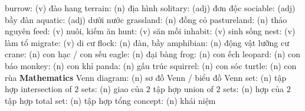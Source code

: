 \begin{multicols}{2}
{		\vskip 0.1cm
		{\color{toancuabi}burrow:} (v)  đào hang
		\vskip 0.1cm
		{\color{toancuabi}terrain:} (n)  địa hình
		\vskip 0.1cm
		{\color{toancuabi}solitary:} (adj)  đơn độc
		\vskip 0.1cm
		{\color{toancuabi}sociable:} (adj)  bầy đàn
		\vskip 0.1cm
		{\color{toancuabi}aquatic:} (adj)  dưới nước
		\vskip 0.1cm
		{\color{toancuabi}grassland:} (n)  đồng cỏ
		\vskip 0.1cm
		{\color{toancuabi}pastureland:} (n)  thảo nguyên
		\vskip 0.1cm
		{\color{toancuabi}feed:} (v)  nuôi, kiếm ăn
		\vskip 0.1cm
		{\color{toancuabi}hunt:} (v)  săn mồi 
		\vskip 0.1cm
		{\color{toancuabi}inhabit:} (v)  sinh sống 
		\vskip 0.1cm
		{\color{toancuabi}nest:} (v)  làm tổ 
		\vskip 0.1cm
		{\color{toancuabi}migrate:} (v)  di cư
		\vskip 0.1cm
		{\color{toancuabi}flock:} (n)  đàn, bầy
		\vskip 0.1cm
		{\color{toancuabi}amphibian:} (n)  động vật lưỡng cư
		\vskip 0.1cm
		{\color{toancuabi}crane:} (n)  con hạc / con sếu
		\vskip 0.1cm
		{\color{toancuabi}eagle:} (n)  đại bàng
		\vskip 0.1cm
		{\color{toancuabi}frog:} (n)  con ếch
		\vskip 0.1cm
		{\color{toancuabi}leopard:} (n)  con báo
		\vskip 0.1cm
		{\color{toancuabi}monkey:} (n)  con khỉ
		\vskip 0.1cm
		{\color{toancuabi}panda:} (n)  gấu trúc
		\vskip 0.1cm
		{\color{toancuabi}squirrel:} (n)  con sóc
		\vskip 0.1cm
		{\color{toancuabi}turtle:} (n)  con rùa 
		\vskip 0.1cm
		\textbf{\color{toancuabi}Mathematics}
		\vskip 0.1cm
		{\color{toancuabi}Venn diagram:} (n)  sơ đồ Venn / biểu đồ Venn
			\vskip 0.1cm
		{\color{toancuabi}set:} (n)  tập hợp
		\vskip 0.1cm
		{\color{toancuabi}intersection of $2$ sets:} (n)  giao của $2$ tập hợp
		\vskip 0.1cm
		{\color{toancuabi}union of $2$ sets:} (n)  hợp của $2$ tập hợp
		\vskip 0.1cm
		{\color{toancuabi}total set:} (n)  tập hợp tổng
		\vskip 0.1cm
		{\color{toancuabi}concept:} (n)  khái niệm}
\end{multicols}
